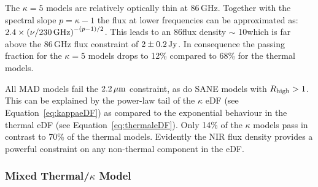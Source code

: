 The $\kappa=5$ models are relatively optically thin at 86\,GHz.
Together with the spectral slope $p=\kappa-1$ the flux at lower frequencies can be approximated as: $2.4\times \left(\nu/230\,\mathrm{GHz}\right)^{-(p-1)/2}$.
This leads to an 86\GHz flux density $\sim$ 10\Jy which is far above the 86\,GHz flux constraint of $2\pm0.2\,\mathrm{Jy}$.
In consequence the passing fraction for the $\kappa=5$ models drops to 12\% compared to 68\% for the thermal models.


All MAD models fail the $2.2\,\mu\mathrm{m}$ constraint, as do SANE models with $R_\mathrm{high}>1$.
This can be explained by the power-law tail of the $\kappa$ eDF (see Equation~\ref{eq:kappaeDF}) as compared to the exponential behaviour in the thermal eDF (see Equation~\ref{eq:thermaleDF}).
Only 14\% of the $\kappa$ models pass in contrast to 70\% of the thermal models.  Evidently the NIR flux density provides a powerful constraint on any non-thermal component in the eDF. 

\subsubsection{Mixed Thermal/\texorpdfstring{$\kappa$}{kappa} Model}

